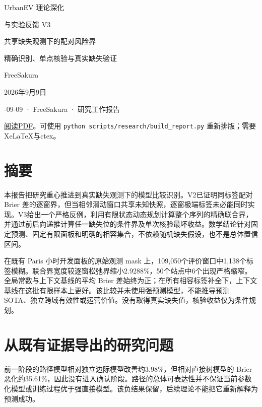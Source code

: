 \documentclass[UTF8,11pt,a4paper,fontset=windows]{ctexart}
\begin{document}
\begin{titlepage}\centering\vspace*{30mm}
{\Huge UrbanEV 理论深化\par}\vspace{8mm}
{\LARGE 与实验反馈 V3\par}\vspace{20mm}
{\Large 共享缺失观测下的配对风险界\par}\vspace{7mm}
{\large 精确识别、单点核验与真实缺失验证\par}
\vfill FreeSakura\par 2026年9月9日\par
\vspace{10mm}{\small 研究工作报告：数学结论与开发证据分开陈述}
\end{titlepage}
\tableofcontents{}-09-09 · FreeSakura · 研究工作报告


\href{https://github.com/FreeSakura/UrbanEV/blob/main/paper/research/UrbanEV_Theory_Feedback_V3.pdf}{阅读PDF}。可使用 \allowbreak{}\texttt{python scripts/\allowbreak{}research/\allowbreak{}build\_\allowbreak{}report.py}\allowbreak{} 重新排版；需要XeLaTeX与ctex。


\section{摘要}

本报告把研究重心推进到真实缺失观测下的模型比较识别。V2已证明同标签配对 Brier 差的逐窗界，但当相邻滑动窗口共享未知快照，逐窗极端标签未必能同时实现。V3给出一个严格反例，利用有限状态动态规划计算整个序列的精确联合界，并通过前后向递推计算任一缺失位的条件界及单次核验最坏收益。数学结论针对固定预测、固定有限面板和明确的相容集合，不依赖随机缺失假设，也不是总体置信区间。


在既有 Paris 小时开发面板的原始观测 mask 上，109,050个评价窗口中1,138个标签模糊。联合界宽度较逐窗松弛界缩小2.9288\%，50个站点中6个出现严格缩窄。全局常数与上下文基线的平均 Brier 差始终为正；在所有相容标签补全下，上下文基线在这批有限样本上更好。该比较并未使用强预测模型，不能推导预测 SOTA、独立跨域有效性或运营价值。没有取得真实缺失值，核验收益仅为条件规划。


\section{从既有证据导出的研究问题}

前一阶段的路径模型相对独立边际模型改善约3.98\%，但相对直接树模型的 Brier 恶化约35.61\%，因此没有进入确认阶段。路径的总体可表达性并不保证当前参数化模型或训练过程优于强直接模型。该负结果保留，后续理论不能把它重新解释为预测成功。
\end{document}
